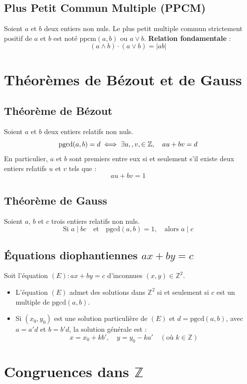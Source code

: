 \documentclass{article}
\begin{document}
	\subsection{Plus Petit Commun Multiple (PPCM)}
	Soient $a$ et $b$ deux entiers non nuls. Le plus petit multiple commun strictement positif de $a$ et $b$ est noté $\text{ppcm}(a, b)$ ou $a \vee b$.
	\textbf{Relation fondamentale} :
	\[ (a \wedge b) \cdot (a \vee b) = |ab| \]
	
	\section{Théorèmes de Bézout et de Gauss}
	
	\subsection{Théorème de Bézout}
	Soient $a$ et $b$ deux entiers relatifs non nuls.
	\[ \text{pgcd}(a, b) = d \iff \ext{u}[, v][]{Z}, \quad au + bv = d \]
	En particulier, $a$ et $b$ sont premiers entre eux si et seulement s'il existe deux entiers relatifs $u$ et $v$ tels que :
	\[ au + bv = 1 \]
	
	\subsection{Théorème de Gauss}
	Soient $a$, $b$ et $c$ trois entiers relatifs non nuls.
	\[ \text{Si } a \mid bc \quad \text{et} \quad \text{pgcd}(a, b) = 1, \quad \text{alors } a \mid c \]
	
	\subsection{Équations diophantiennes $ax + by = c$}
	Soit l'équation $(E) : ax + by = c$ d'inconnues $(x, y) \in \mathbb{Z}^2$.
	\begin{itemize}
		\item L'équation $(E)$ admet des solutions dans $\mathbb{Z}^2$ si et seulement si $c$ est un multiple de $\text{pgcd}(a, b)$.
		\item Si $(x_0, y_0)$ est une solution particulière de $(E)$ et $d = \text{pgcd}(a, b)$, avec $a = a'd$ et $b = b'd$, la solution générale est :
		\[ x = x_0 + kb', \quad y = y_0 - ka' \quad (\text{où } k \in \mathbb{Z}) \]
	\end{itemize}
	
	\section{Congruences dans $\mathbb{Z}$}
	
\end{document}
